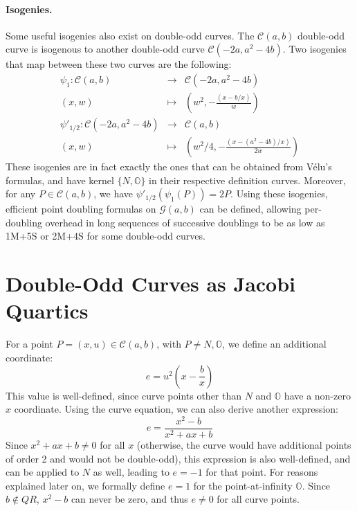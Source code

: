 \documentclass{llncs}
\newcommand{\QR}{QR}
\newcommand{\cC}{\mathcal{C}}
\newcommand{\cG}{\mathcal{G}}
\newcommand{\neutral}{\mathbb{O}}
\begin{document}
\paragraph{Isogenies.}
Some useful isogenies also exist on double-odd curves. The $\cC(a,b)$
double-odd curve is isogenous to another double-odd curve $\cC(-2a,
a^2-4b)$. Two isogenies that map between these two curves are the
following:
\begin{eqnarray*}
    \psi_1 : \cC(a, b) &\longrightarrow& \cC(-2a, a^2-4b) \\
    (x, w) &\longmapsto& \left(w^2, -\frac{(x - b/x)}{w}\right) \\
    \psi'_{1/2} : \cC(-2a, a^2-4b) &\longrightarrow& \cC(a, b) \\
    (x, w) &\longmapsto& \left(w^2/4, -\frac{(x - (a^2-4b)/x)}{2w}\right)
\end{eqnarray*}
These isogenies are in fact exactly the ones that can be obtained from
Vélu's formulas\cite{Vel1971}, and have kernel $\{N,\neutral\}$ in their
respective definition curves. Moreover, for any $P\in\cC(a,b)$, we have
$\psi'_{1/2}(\psi_1(P)) = 2P$. Using these isogenies, efficient point
doubling formulas on $\cG(a,b)$ can be defined, allowing per-doubling
overhead in long sequences of successive doublings to be as low as 1M+5S
or 2M+4S for some double-odd curves.


\section{Double-Odd Curves as Jacobi Quartics}\label{sec:quartic}

For a point $P = (x,u) \in\cC(a,b)$, with $P \neq N,\neutral$, we define
an additional coordinate:
\begin{equation*}
    e = u^2 \left(x - \frac{b}{x}\right)
\end{equation*}
This value is well-defined, since curve points other than $N$ and $\neutral$
have a non-zero $x$ coordinate. Using the curve equation, we can also derive
another expression:
\begin{equation*}
    e = \frac{x^2 - b}{x^2 + ax + b}
\end{equation*}
Since $x^2 + ax + b \neq 0$ for all $x$ (otherwise, the curve would have
additional points of order 2 and would not be double-odd), this
expression is also well-defined, and can be applied to $N$ as well,
leading to $e = -1$ for that point. For reasons explained later on, we
formally define $e = 1$ for the point-at-infinity $\neutral$. Since $b
\notin\QR$, $x^2 - b$ can never be zero, and thus $e\neq 0$ for all
curve points.
\end{document}
